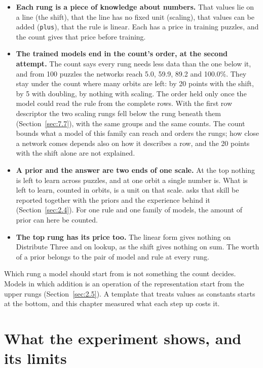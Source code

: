 \begin{itemize}
\item \textbf{Each rung is a piece of knowledge about numbers.} That values lie on a line (the shift), that the line has no fixed unit (scaling), that values can be added (\texttt{plus}), that the rule is linear. Each has a price in training puzzles, and the count gives that price before training.
\item \textbf{The trained models end in the count's order, at the second attempt.} The count says every rung needs less data than the one below it, and from 100 puzzles the networks reach 5.0, 59.9, 89.2 and 100.0\%. They stay under the count where many orbits are left: by 20 points with the shift, by 5 with doubling, by nothing with scaling. The order held only once the model could read the rule from the complete rows. With the first row descriptor the two scaling rungs fell below the rung beneath them (Section~\ref{sec:7.7}), with the same groups and the same counts. The count bounds what a model of this family can reach and orders the rungs; how close a network comes depends also on how it describes a row, and the 20 points with the shift alone are not explained.
\item \textbf{A prior and the answer are two ends of one scale.} At the top nothing is left to learn across puzzles, and at one orbit a single number is. What is left to learn, counted in orbits, is a unit on that scale. \citet[pp. 1 and 43]{chollet2019measure} asks that skill be reported together with the priors and the experience behind it (Section~\ref{sec:2.4}). For one rule and one family of models, the amount of prior can here be counted.
\item \textbf{The top rung has its price too.} The linear form gives nothing on Distribute Three and on lookup, as the shift gives nothing on sum. The worth of a prior belongs to the pair of model and rule at every rung.
\end{itemize}

Which rung a model should start from is not something the count decides. Models in which addition is an operation of the representation start from the upper rungs (Section~\ref{sec:2.5}). A template that treats values as constants starts at the bottom, and this chapter measured what each step up costs it.

\section{What the experiment shows, and its limits}\label{sec:7.9}

